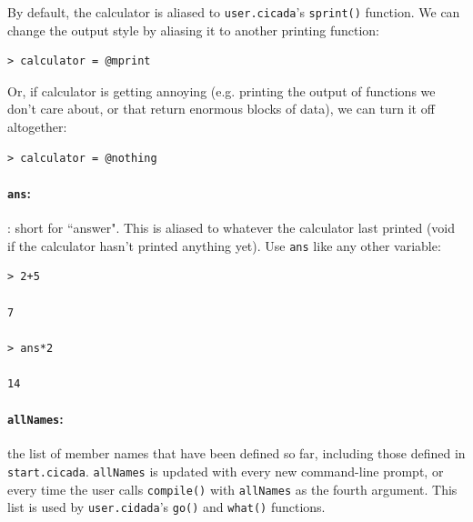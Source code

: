 \documentclass{article}
\newenvironment{code}{
       \begin{list}{}{
               \setlength{\leftmargin}{.4in}
               \setlength{\rightmargin}{0in}
               \setlength{\topsep}{.2in}
       }
       \small
       \item[] }
       { \end{list}   }
\begin{document}
By default, the calculator is aliased to \verb#user.cicada#'s \verb#sprint()# function.  We can change the output style by aliasing it to another printing function:

\begin{code} \begin{verbatim}
> calculator = @mprint
\end{verbatim} \end{code}

\noindent Or, if calculator is getting annoying (e.g. printing the output of functions we don't care about, or that return enormous blocks of data), we can turn it off altogether:

\begin{code} \begin{verbatim}
> calculator = @nothing
\end{verbatim} \end{code}




\paragraph{\texttt{ans}:}:  short for ``answer".  This is aliased to whatever the calculator last printed (void if the calculator hasn't printed anything yet).  Use \verb#ans# like any other variable:

\begin{code} \begin{verbatim}
> 2+5

7

> ans*2

14
\end{verbatim} \end{code}




\paragraph{\texttt{allNames}:}  the list of member names that have been defined so far, including those defined in \verb#start.cicada#.  \verb#allNames# is updated with every new command-line prompt, or every time the user calls \verb#compile()# with \verb#allNames# as the fourth argument.  This list is used by \verb#user.cidada#'s \verb#go()# and \verb#what()# functions.
\end{document}
